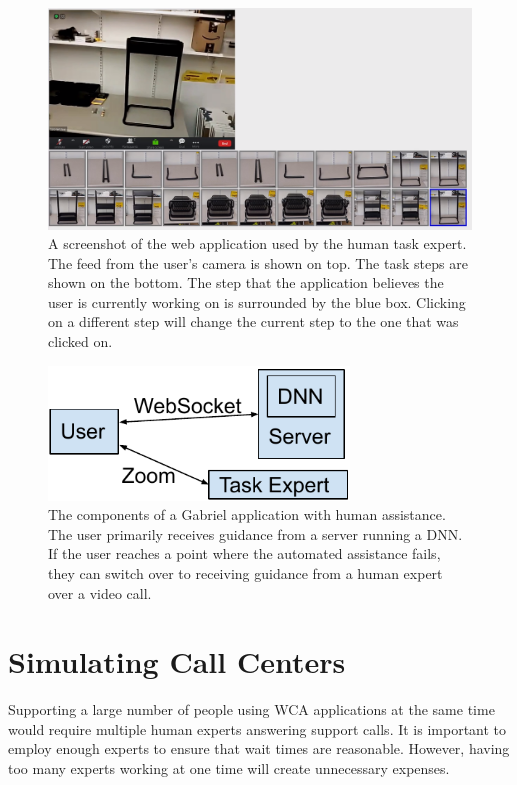 \begin{figure}[h]
  \includegraphics[width=\textwidth]{figures/expert_ui.png}
  \caption{A screenshot of the web application used by the human task expert.
    The feed from the user's camera is shown on top. The task steps are shown on
    the bottom. The step that the application believes the user is currently
    working on is surrounded by the
    blue box. Clicking on a different step will change the current step
    to the one that was clicked on.
  }\label{fig:expertui}
\end{figure}

\begin{figure}[h]
  \includegraphics[width=8cm]{figures/human_assitance.pdf}
  \caption{The components of a Gabriel application with human assistance. The
    user primarily receives guidance from a server running a DNN. If the user
    reaches a point where the automated assistance fails, they can switch over
    to receiving guidance from a human expert over a video call.
  }\label{fig:expert_components}
\end{figure}

\section{Simulating Call Centers}

Supporting a large number of people using WCA applications at the same time
would require multiple human experts answering support calls.
It is important to employ enough experts to ensure that wait times are
reasonable.
However, having too many experts working at one time will create unnecessary
expenses.

